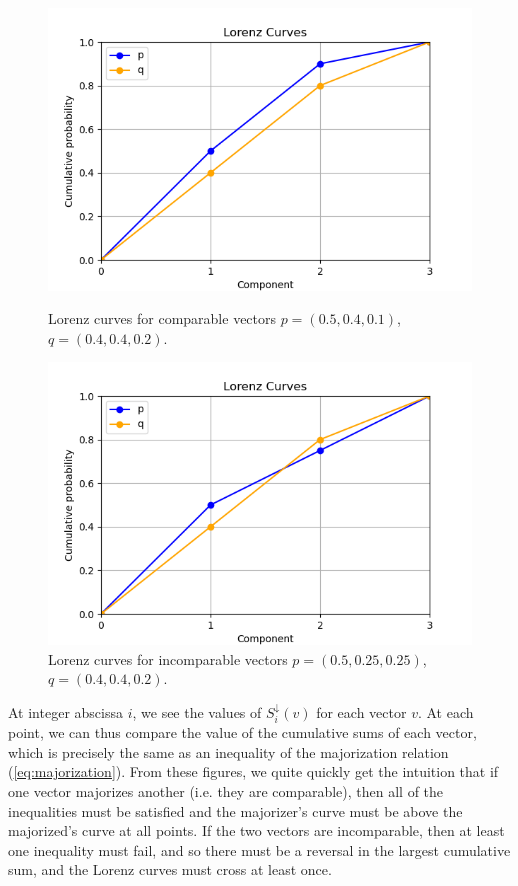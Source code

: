 \begin{figure}[h!]
    \centering
    \begin{minipage}{.48\textwidth}
        \centering
        \includegraphics[scale=0.45]{images/lorenz_comp.png}
        \caption{Lorenz curves for comparable vectors $p = (0.5, 0.4, 0.1)$, $q = (0.4, 0.4, 0.2)$.}
        \label{fig:lorenz_comparable_example}
    \end{minipage}
    \hfill
    \begin{minipage}{0.48\textwidth}
        \centering
        \includegraphics[scale=0.45]{images/lorenz_incomp.png}
        \caption{Lorenz curves for incomparable vectors $p = (0.5, 0.25, 0.25)$, $q = (0.4, 0.4, 0.2)$.}
        \label{fig:lorenz_incomparable_example}
    \end{minipage}
\end{figure}

At integer abscissa $i$, we see the values of $S_i^\downarrow (v)$ for each vector $v$. At each point, we can thus compare the value of the cumulative sums of each vector, which is precisely the same as an inequality of the majorization relation (\ref{eq:majorization}). From these figures, we quite quickly get the intuition that if one vector majorizes another (i.e. they are comparable), then all of the inequalities must be satisfied and the majorizer's curve must be above the majorized's curve at all points. If the two vectors are incomparable, then at least one inequality must fail, and so there must be a reversal in the largest cumulative sum, and the Lorenz curves must cross at least once.



